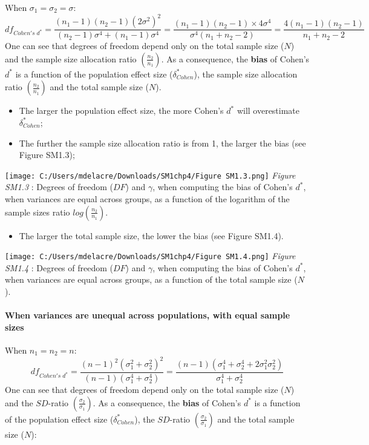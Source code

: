 \documentclass[
  english,
  man,mask,floatsintext]{apa6}
\providecommand{\tightlist}{%
  \setlength{\itemsep}{0pt}\setlength{\parskip}{0pt}}
\let\oldparagraph\paragraph
\renewcommand{\paragraph}[1]{\oldparagraph{#1}\mbox{}}
\begin{document}
When \(\sigma_1=\sigma_2=\sigma\):
\[df_{Cohen's \; d^*} = \frac{(n_1-1)(n_2-1)(2\sigma^2)^2}{(n_2-1)\sigma^4+(n_1-1)\sigma^4} = \frac{(n_1-1)(n_2-1)\times 4\sigma^4}{\sigma^4(n_1+n_2-2)} = \frac{4(n_1-1)(n_2-1)}{n_1+n_2-2}\]
One can see that degrees of freedom depend only on the total sample size (\(N\)) and the sample size allocation ratio \(\left( \frac{n_2}{n_1}\right)\). As a consequence, the \textbf{bias} of Cohen's \(d^*\) is a function of the population effect size (\(\delta^*_{Cohen}\)), the sample size allocation ratio \(\left( \frac{n_2}{n_1}\right)\) and the total sample size (\(N\)).

\begin{itemize}
\item
  The larger the population effect size, the more Cohen's \(d^*\) will overestimate \(\delta^*_{Cohen}\);
\item
  The further the sample size allocation ratio is from 1, the larger the bias (see Figure SM1.3);
\end{itemize}

\texttt{[image: C:/Users/mdelacre/Downloads/SM1chp4/Figure SM1.3.png]}
\emph{Figure SM1.3} : Degrees of freedom (\(DF\)) and \(\gamma\), when computing the bias of Cohen's \(d^*\), when variances are equal across groups, as a function of the logarithm of the sample sizes ratio \(log\left(\frac{n_2}{n_1} \right)\).

\begin{itemize}
\tightlist
\item
  The larger the total sample size, the lower the bias (see Figure SM1.4).
\end{itemize}

\texttt{[image: C:/Users/mdelacre/Downloads/SM1chp4/Figure SM1.4.png]}
\emph{Figure SM1.4} : Degrees of freedom (\(DF\)) and \(\gamma\), when computing the bias of Cohen's \(d^*\), when variances are equal across groups, as a function of the total sample size (\(N\)).

\hypertarget{when-variances-are-unequal-across-populations-with-equal-sample-sizes}{%
\paragraph{When variances are unequal across populations, with equal sample sizes}\label{when-variances-are-unequal-across-populations-with-equal-sample-sizes}}

When \(n_1 = n_2 = n\):
\[df_{Cohen's \; d^*} = \frac{(n-1)^2(\sigma^2_1+\sigma^2_2)^2}{(n-1)(\sigma^4_1+\sigma^4_2)} =  \frac{(n-1)(\sigma^4_1+\sigma^4_2+2\sigma^2_1\sigma^2_2)}{\sigma^4_1+\sigma^4_2}\]
One can see that degrees of freedom depend only on the total sample size (\(N\)) and the \(SD\)-ratio \(\left( \frac{\sigma_2}{\sigma_1}\right)\). As a consequence, the \textbf{bias} of Cohen's \(d^*\) is a function of the population effect size (\(\delta^*_{Cohen}\)), the \(SD\)-ratio \(\left( \frac{\sigma_2}{\sigma_1}\right)\) and the total sample size (\(N\)):
\end{document}
